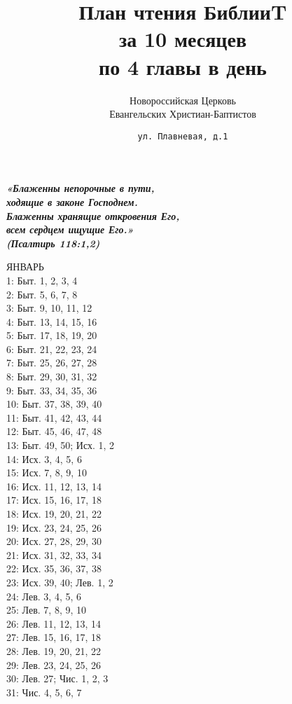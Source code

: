 \documentclass[fontsize=16pt,letterpaper,DIV=6]{scrartcl}
\title{План чтения БиблииT \\за 10 месяцев \\по 4 главы в день}
\author{Новороссийская Церковь\\Евангельских Христиан-Баптистов}
\date{\texttt{ул. Плавневая, д.1}}
\begin{document}
\maketitle
\setcounter{page}{0}
\thispagestyle{empty}
\clearpage
{}
{\centering\Large\itshape\bfseries «Блаженны непорочные в пути,\\ ходящие в законе Господнем.\\
Блаженны хранящие откровения Его,\\ всем сердцем ищущие Его.»\\
(Псалтирь 118:1,2)
\par}
\clearpage
\begin{multicols}{2}
ЯНВАРЬ
\\  1: Быт. 1, 2, 3, 4
\\  2: Быт. 5, 6, 7, 8
\\  3: Быт. 9, 10, 11, 12
\\  4: Быт. 13, 14, 15, 16
\\  5: Быт. 17, 18, 19, 20
\\  6: Быт. 21, 22, 23, 24
\\  7: Быт. 25, 26, 27, 28
\\  8: Быт. 29, 30, 31, 32
\\  9: Быт. 33, 34, 35, 36
\\  10: Быт. 37, 38, 39, 40
\\  11: Быт. 41, 42, 43, 44
\\  12: Быт. 45, 46, 47, 48
\\  13: Быт. 49, 50; Исх. 1, 2
\\  14: Исх. 3, 4, 5, 6
\\  15: Исх. 7, 8, 9, 10
\\  16: Исх. 11, 12, 13, 14
\\  17: Исх. 15, 16, 17, 18
\\  18: Исх. 19, 20, 21, 22
\\  19: Исх. 23, 24, 25, 26
\\  20: Исх. 27, 28, 29, 30
\\  21: Исх. 31, 32, 33, 34
\\  22: Исх. 35, 36, 37, 38
\\  23: Исх. 39, 40; Лев. 1, 2
\\  24: Лев. 3, 4, 5, 6
\\  25: Лев. 7, 8, 9, 10
\\  26: Лев. 11, 12, 13, 14
\\  27: Лев. 15, 16, 17, 18
\\  28: Лев. 19, 20, 21, 22
\\  29: Лев. 23, 24, 25, 26
\\  30: Лев. 27; Чис. 1, 2, 3
\\  31: Чис. 4, 5, 6, 7


\end{multicols}
\end{document}
